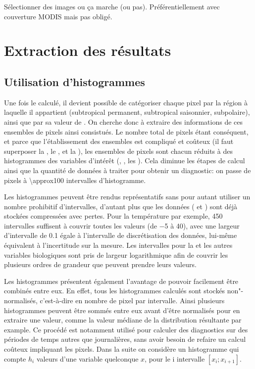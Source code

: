 \documentclass[index]{subfiles}
\begin{document}
Sélectionner des images ou ça marche (ou pas).
Préférentiellement avec couverture MODIS mais pas obligé.

\section{Extraction des résultats}
\label{sec:extraction-res}

\subsection{Utilisation d'histogrammes}
\label{sec:extraction-hist}

Une fois le  calculé, il devient possible de catégoriser chaque pixel par la région à laquelle il appartient (subtropical permanent, subtropical saisonnier, subpolaire), ainsi que par sa valeur de .
On cherche donc à extraire des informations de ces ensembles de pixels ainsi consistués.
Le nombre total de pixels étant conséquent, et parce que l'établissement des ensembles est compliqué et coûteux (il faut superposer la , le , et la ), les ensembles de pixels sont chacun réduits à des histogrammes des variables d'intérêt (, , les ).
Cela diminue les étapes de calcul ainsi que la quantité de données à traiter pour obtenir un diagnostic: on passe de  pixels à \num{\approx100} intervalles d'histogramme.

Les histogrammes peuvent être rendus représentatifs sans pour autant utiliser un nombre prohibitif d'intervalles, d'autant plus que les données ( et ) sont déjà stockées compressées avec pertes. Pour la température par exemple, 450 intervalles suffisent à couvrir toutes les valeurs (de \qty{-5}{\dC} à \qty{40}{\dC}), avec une largeur d'intervalle de \qty{0.1}{\dC} égale à l'intervalle de discrétisation des données, lui-même équivalent à l'incertitude sur la mesure.
Les intervalles pour la  et les autres variables biologiques sont pris de largeur logarithmique afin de couvrir les plusieurs ordres de grandeur que peuvent prendre leurs valeurs.

Les histogrammes présentent également l'avantage de pouvoir facilement être combinés entre eux.
En effet, tous les histogrammes calculés sont stockés non"-normalisés, c'est-à-dire en nombre de pixel par intervalle. Ainsi plusieurs histogrammes peuvent être sommés entre eux avant d'être normalisés pour en extraire une valeur, comme la valeur médiane de la distribution résultante par example.
Ce procédé est notamment utilisé pour calculer des diagnostics sur des périodes de temps autres que journalières, sans avoir besoin de refaire un calcul coûteux impliquant les pixels.
Dans la suite on considère un histogramme qui compte \(h_i\) valeurs d'une variable quelconque \(x\), pour le i\ieme{} intervalle \(\left[x_i; x_{i+1} \right]\).
\end{document}
